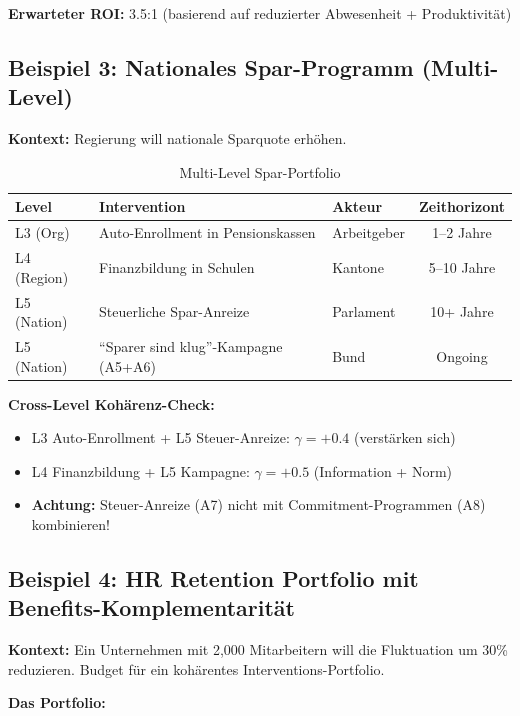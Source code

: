 \textbf{Erwarteter ROI:} 3.5:1 (basierend auf reduzierter Abwesenheit + Produktivität)

\subsection{Beispiel 3: Nationales Spar-Programm (Multi-Level)}

\textbf{Kontext:} Regierung will nationale Sparquote erhöhen.

\begin{table}[htbp]
\centering
\caption{Multi-Level Spar-Portfolio}
\label{tab:20-example-national}
\renewcommand{\arraystretch}{1.3}
\small
\begin{tabular}{@{}lllc@{}}
\toprule
\textbf{Level} & \textbf{Intervention} & \textbf{Akteur} & \textbf{Zeithorizont} \\
\midrule
L3 (Org) & Auto-Enrollment in Pensionskassen & Arbeitgeber & 1--2 Jahre \\
L4 (Region) & Finanzbildung in Schulen & Kantone & 5--10 Jahre \\
L5 (Nation) & Steuerliche Spar-Anreize & Parlament & 10+ Jahre \\
L5 (Nation) & ``Sparer sind klug''-Kampagne (A5+A6) & Bund & Ongoing \\
\bottomrule
\end{tabular}
\end{table}

\textbf{Cross-Level Kohärenz-Check:}
\begin{itemize}[nosep]
\item L3 Auto-Enrollment + L5 Steuer-Anreize: $\gamma = +0.4$ (verstärken sich)
\item L4 Finanzbildung + L5 Kampagne: $\gamma = +0.5$ (Information + Norm)
\item \textbf{Achtung:} Steuer-Anreize (A7) nicht mit Commitment-Programmen (A8) kombinieren!
\end{itemize}


\subsection{Beispiel 4: HR Retention Portfolio mit Benefits-Komplementarität}
\label{sec:20-example-hr-retention}

\textbf{Kontext:} Ein Unternehmen mit 2,000 Mitarbeitern will die Fluktuation um 30\% reduzieren. Budget für ein kohärentes Interventions-Portfolio.

\textbf{Das Portfolio:}

